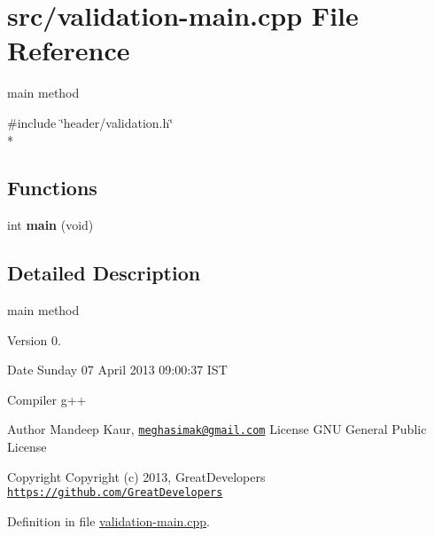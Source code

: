 \hypertarget{validation-main_8cpp}{\section{src/validation-\/main.cpp File Reference}
\label{validation-main_8cpp}
}


main method  


{\ttfamily \#include \char`\"{}header/validation.\-h\char`\"{}}\\*
\subsection*{Functions}
\begin{DoxyCompactItemize}
\item 
\hypertarget{validation-main_8cpp_a840291bc02cba5474a4cb46a9b9566fe}{int {\bfseries main} (void)}\label{validation-main_8cpp_a840291bc02cba5474a4cb46a9b9566fe}

\end{DoxyCompactItemize}


\subsection{Detailed Description}
main method \begin{DoxyVersion}{Version}
0. 
\end{DoxyVersion}
\begin{DoxyDate}{Date}
Sunday 07 April 2013 09\-:00\-:37 I\-S\-T\par
 Compiler g++
\end{DoxyDate}
\begin{DoxyAuthor}{Author}
Mandeep Kaur, \href{mailto:meghasimak@gmail.com}{\tt meghasimak@gmail.\-com} License G\-N\-U General Public License 
\end{DoxyAuthor}
\begin{DoxyCopyright}{Copyright}
Copyright (c) 2013, Great\-Developers \href{https://github.com/GreatDevelopers}{\tt https\-://github.\-com/\-Great\-Developers} 
\end{DoxyCopyright}


Definition in file \hyperlink{validation-main_8cpp_source}{validation-\/main.\-cpp}.

